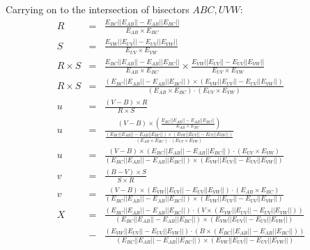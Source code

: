 \documentclass[12pt,a4paper,oneside,openany]{article}
\begin{document}
Carrying on to the intersection of bisectors $ABC, UVW$:
\begin{eqnarray*}
R &=& \frac{E_{BC} || E_{AB} || - E_{AB}|| E_{BC} ||}{E_{AB} \times E_{BC}} \\
S &=& \frac{E_{VW} || E_{UV} || - E_{UV}|| E_{VW} ||}{E_{UV} \times E_{VW}} \\
R \times S &=& \frac{E_{BC} || E_{AB} || - E_{AB}|| E_{BC} ||}{E_{AB} \times E_{BC}} \times \frac{E_{VW} || E_{UV} || - E_{UV}|| E_{VW} ||}{E_{UV} \times E_{VW}} \\
R \times S &=& \frac{(E_{BC} || E_{AB} || - E_{AB}|| E_{BC} ||) \times (E_{VW} || E_{UV} || - E_{UV}|| E_{VW} ||)}{(E_{AB} \times E_{BC}) \cdot (E_{UV} \times E_{VW})} \\
u &=& \frac{(V-B) \times R}{R \times S} \\
u &=& \frac{(V-B) \times \left( \frac{E_{BC} || E_{AB} || - E_{AB}|| E_{BC} ||}{E_{AB} \times E_{BC}}\right)}{\frac{(E_{BC} || E_{AB} || - E_{AB}|| E_{BC} ||) \times (E_{VW} || E_{UV} || - E_{UV}|| E_{VW} ||)}{(E_{AB} \times E_{BC}) \cdot (E_{UV} \times E_{VW})}} \\
u &=& \frac{(V-B) \times \left( {E_{BC} || E_{AB} || - E_{AB}|| E_{BC} ||}\right) \cdot (E_{UV} \times E_{VW})}{(E_{BC} || E_{AB} || - E_{AB}|| E_{BC} ||) \times (E_{VW} || E_{UV} || - E_{UV}|| E_{VW} ||)} \\
v &=& \frac{(B-V) \times S}{S \times R} \\
v &=& \frac{(V-B) \times \left( {E_{VW} || E_{UV} || - E_{UV}|| E_{VW} ||}\right) \cdot (E_{AB} \times E_{BC})}{(E_{BC} || E_{AB} || - E_{AB}|| E_{BC} ||) \times (E_{VW} || E_{UV} || - E_{UV}|| E_{VW} ||)} \\
X &=& \frac{(E_{BC} || E_{AB} || - E_{AB}|| E_{BC} ||) \cdot (V \times (E_{VW} || E_{UV} || - E_{UV}|| E_{VW} ||)) }{(E_{BC} || E_{AB} || - E_{AB}|| E_{BC} ||) \times (E_{VW} || E_{UV} || - E_{UV}|| E_{VW} ||)} \\
  &-& \frac{(E_{VW} || E_{UV} || - E_{UV}|| E_{VW} ||) \cdot (B \times (E_{BC} || E_{AB} || - E_{AB}|| E_{BC} ||)) }{(E_{BC} || E_{AB} || - E_{AB}|| E_{BC} ||) \times (E_{VW} || E_{UV} || - E_{UV}|| E_{VW} ||)}
\end{eqnarray*}
\end{document}
